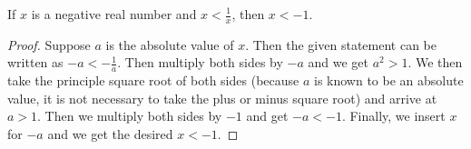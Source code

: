 
\begin{theorem}
  If $x$ is a negative real number and $x < \frac{1}{x}$, then $x < -1$.
\end{theorem}

\begin{proof}
  Suppose $a$ is the absolute value of $x$. Then the given statement can be
  written as $-a < - \frac{1}{a}$. Then multiply both sides by $-a$ and we get
  $a^2 > 1$. We then take the principle square root of both sides (because $a$
  is known to be an absolute value, it is not necessary to take the plus or
  minus square root) and arrive at $a>1$. Then we multiply both sides by $-1$
  and get $-a<-1$. Finally, we insert $x$ for $-a$ and we get the desired $x <
  -1$.
\end{proof}



\begin{align*}
\end{align*}
